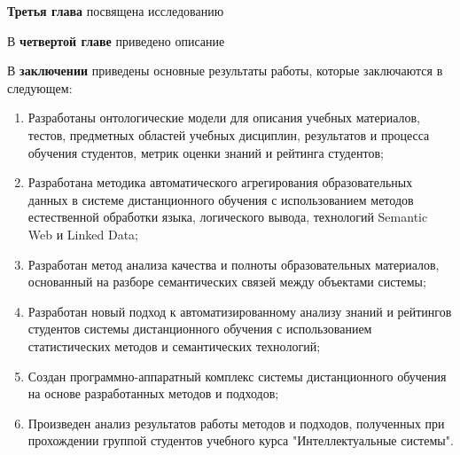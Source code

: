 \textbf{Третья глава} посвящена исследованию 

В \textbf{четвертой главе} приведено описание 

В \textbf{заключении} приведены основные результаты работы, которые заключаются в следующем:
\begin{enumerate}
 \item Разработаны онтологические модели для описания учебных материалов, тестов, предметных областей учебных дисциплин, результатов и процесса обучения студентов, метрик оценки знаний и рейтинга студентов;
 \item Разработана методика автоматического агрегирования образовательных данных в системе дистанционного обучения с использованием методов естественной обработки языка, логического вывода, технологий Semantic Web и Linked Data;
 \item Разработан метод анализа качества и полноты образовательных материалов, основанный на разборе семантических связей между объектами системы;
  \item Разработан новый подход к автоматизированному анализу знаний и рейтингов студентов системы дистанционного обучения с использованием статистических методов и семантических технологий;
  \item Создан программно-аппаратный комплекс системы дистанционного обучения на основе разработанных методов и подходов;
  \item Произведен анализ результатов работы методов и подходов, полученных при прохождении группой студентов учебного курса "Интеллектуальные системы".
  \end{enumerate}


\renewcommand{\refname}{\Large Публикации автора по теме диссертации}
\nocite{*}
